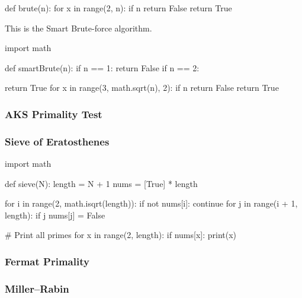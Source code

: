 \documentclass[main.tex]{subfiles}
\begin{document}
\begin{python}
    def brute(n):
        for x in range(2, n):
            if n %
                return False
        return True
\end{python}

\vspace{10mm}

This is the Smart Brute-force algorithm.

\begin{python}
    import math

    def smartBrute(n):
        if n == 1:
            return False
        if n == 2:

            return True
        for x in range(3, math.sqrt(n), 2):
            if n %
                return False
        return True
\end{python}

\subsubsection{AKS Primality Test}


\subsubsection{Sieve of Eratosthenes}

\begin{python}
    import math

    def sieve(N):
        length = N + 1
        nums = [True] * length

        for i in range(2, math.isqrt(length)):
            if not nums[i]:
                continue
            for j in range(i + 1, length):
                if j %
                    nums[j] = False

        # Print all primes
        for x in range(2, length):
            if nums[x]:
                print(x)
\end{python}

\subsubsection{Fermat Primality}

\subsubsection{Miller–Rabin}
\end{document}
